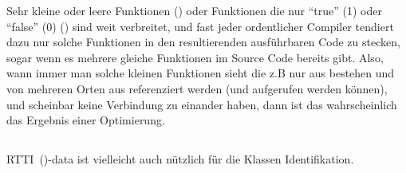 Sehr kleine oder leere Funktionen  ()
oder Funktionen die nur ``true'' (1) oder ``false'' (0) () sind weit verbreitet,
und fast jeder ordentlicher Compiler tendiert dazu nur solche Funktionen in den resultierenden ausf\"uhrbaren Code zu stecken,
sogar wenn es mehrere gleiche Funktionen im Source Code bereits gibt. 
Also, wann immer man solche kleinen Funktionen sieht die z.B nur aus  bestehen und von mehreren 
Orten aus referenziert werden (und aufgerufen werden k\"onnen), und scheinbar keine Verbindung zu einander haben, dann 
ist das wahrscheinlich das Ergebnis einer Optimierung. 

\subsection{\Cpp}

\ac{RTTI}~()-data ist vielleicht auch n\"utzlich f\"ur die \Cpp Klassen Identifikation.
